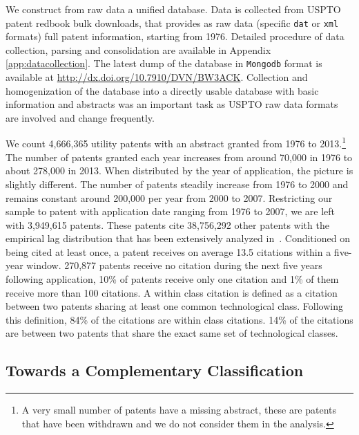 \documentclass[article]{article}%
\begin{document}
We construct from raw data a unified database. Data is collected from USPTO patent redbook bulk downloads, that provides as raw data (specific \texttt{dat} or \texttt{xml} formats) full patent information, starting from 1976. Detailed procedure of data collection, parsing and consolidation are available in Appendix \ref{app:datacollection}. The latest dump of the database in \texttt{Mongodb} format is available at \url{http://dx.doi.org/10.7910/DVN/BW3ACK}. Collection and homogenization of the database into a directly usable database with basic information and abstracts was an important task as USPTO raw data formats are involved and change frequently.

We count 4,666,365 utility patents with an abstract granted from 1976 to 2013.\footnote{A very small number of patents have a missing abstract, these are patents that have been withdrawn and we do not consider them in the analysis.} The number of patents granted each year increases from around 70,000 in 1976 to about 278,000 in 2013. When distributed by the year of application, the picture is slightly different. The number of patents steadily increase from 1976 to 2000 and remains constant around 200,000 per year from 2000 to 2007. Restricting our sample to patent with application date ranging from 1976 to 2007, we are left with 3,949,615 patents. These patents cite 38,756,292 other patents with the empirical lag distribution that has been extensively analyzed in~\citet{Hall2001}. Conditioned on being cited at least once, a patent receives on average 13.5 citations within a five-year window. 270,877 patents receive no citation during the next five years following application, 10\% of patents receive only one citation and 1\% of them receive more than 100 citations. A within class citation is defined as a citation between two patents sharing at least one common technological class. Following this definition, 84\% of the citations are within class citations. 14\% of the citations are between two patents that share the exact same set of technological classes.

\subsection{Towards a Complementary Classification}
\end{document}
